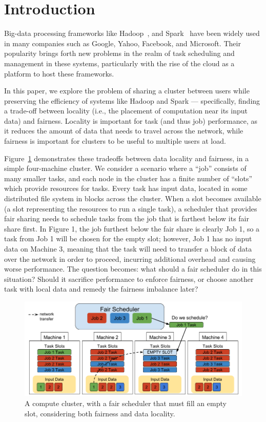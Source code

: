 \section{Introduction}\label{sec:intro}
Big-data processing frameworks like Hadoop~\cite{Shvachko:2010}, and Spark~\cite{Zaharia2012} have been widely 
used in many companies such as Google, Yahoo, Facebook, and Microsoft. Their popularity 
brings forth new problems in the realm of task scheduling and management in these systems,
particularly with the rise of the cloud as a platform to host these frameworks.

In this paper, we explore the problem of sharing a cluster between users while preserving 
the efficiency of systems like Hadoop and Spark --- specifically, finding a trade-off 
between locality (i.e., the placement of computation near its input data) and fairness. 
Locality is important for task (and thus job) performance, as it reduces the amount of data 
that needs to travel across the network, while fairness is important for clusters to be 
useful to multiple users at load. 

Figure~\ref{fig:cluster}  demonstrates these tradeoffs between data locality and fairness,
in a simple four-machine cluster. We consider a
scenario where a ``job'' consists of many smaller tasks, and each node in the cluster 
has a finite number of ``slots'' which provide resources for tasks. Every task has input data,
located in some distributed file system in blocks across the cluster. When a slot
becomes available (a slot representing the resources to run a single task),
a scheduler that provides fair sharing needs to schedule tasks from the job 
that is farthest below its fair share first. In Figure 1, the job furthest below
the fair share is clearly Job 1, so a task from Job 1 will be chosen for the empty slot; however,
Job 1 has no input data on Machine 3, meaning that the task will need to transfer a block
of data over the network in order to proceed, incurring additional overhead and causing
worse performance. The question becomes: what should a fair scheduler do
in this situation? Should it sacrifice performance to enforce fairness, or choose another task
with local data and remedy the fairness imbalance later? 

\begin{figure}[t]
        \includegraphics[width=\linewidth]{./fig1.png}
        \caption{A compute cluster, with a fair scheduler that must fill an empty slot, considering both fairness and data locality.}
        \label{fig:cluster}
    \endminipage
\end{figure}

